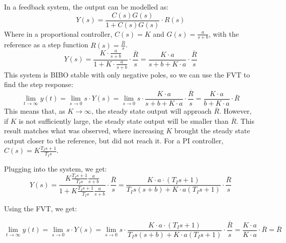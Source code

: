 \documentclass{article}
\begin{document}
In a feedback system, the output can be modelled as:
$$Y(s) = \frac{C(s)G(s)}{1 + C(s)G(s)} \cdot R(s)$$
Where in a proportional controller, $C(s) = K$ and $G(s) = \frac{a}{s + b}$, with the reference as a step function $R(s) = \frac{\overline{R}}{s}$.
$$Y(s) = \frac{K \cdot \frac{a}{s + b}}{1 + K \cdot \frac{a}{s + b}} \cdot \frac{\overline{R}}{s} = \frac{K \cdot a}{s + b + K \cdot a} \cdot \frac{\overline{R}}{s}$$
This system is BIBO stable with only negative poles, so we can use the FVT to find the step response:
$$\lim_{t \to \infty} y(t) = \lim_{s \to 0} s \cdot Y(s) = \lim_{s \to 0} s \cdot \frac{K \cdot a}{s + b + K \cdot a} \cdot \frac{\overline{R}}{s} = \frac{K \cdot a}{b + K \cdot a} \cdot \overline{R}$$
This means that, as $K \to \infty$, the steady state output will approach $\overline{R}$. However, if $K$ is not sufficiently large, the steady state output will be smaller than $\overline{R}$. This result matches what was observed, where increasing $K$ brought the steady state output closer to the reference, but did not reach it.
\newpage
For a PI controller, $C(s) = K\frac{T_I s + 1}{T_I s}$. 

Plugging into the system, we get:
$$Y(s) = \frac{K \frac{T_I s + 1}{T_I s } \frac{a}{s+b}}{1 + K \frac{T_I s + 1}{T_I s} \frac{a}{s+b}} \cdot \frac{\overline{R}}{s} = \frac{K \cdot a \cdot (T_I s + 1)}{T_I s (s + b) + K \cdot a (T_I s + 1)} \cdot \frac{\overline{R}}{s}$$

Using the FVT, we get:

$$\lim_{t \to \infty} y(t) = \lim_{s \to 0} s \cdot Y(s) = \lim_{s \to 0} s \cdot \frac{K \cdot a \cdot (T_I s + 1)}{T_I s (s + b) + K \cdot a (T_I s + 1)} \cdot \frac{\overline{R}}{s} = \frac{K \cdot a}{K \cdot a} \cdot \overline{R} = \overline{R}$$
\end{document}
